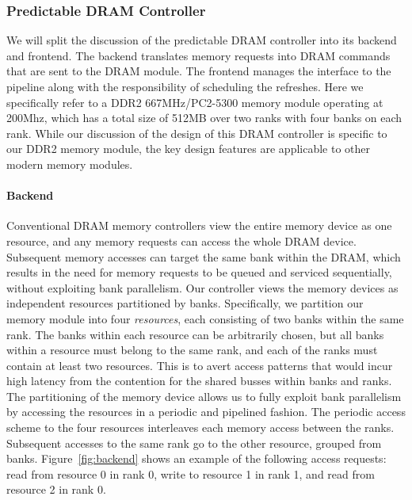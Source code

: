 \subsubsection{Predictable DRAM Controller}
\label{sec:pret_dram_controller}
We will split the discussion of the predictable DRAM controller into its backend and frontend. 
The backend translates memory requests into DRAM commands that are sent to the DRAM module.
The frontend manages the interface to the pipeline along with the responsibility of scheduling the refreshes.
Here we specifically refer to a DDR2 667MHz/PC2-5300 memory module operating at 200Mhz, which has a total size of 512MB over two ranks with four banks on each rank.
While our discussion of the design of this DRAM controller is specific to our DDR2 memory module, the key design features are applicable to other modern memory modules.

\paragraph{Backend}
Conventional DRAM memory controllers view the entire memory device as one resource, and any memory requests can access the whole DRAM device. 
Subsequent memory accesses can target the same bank within the DRAM, which results in the need for memory requests to be queued and serviced sequentially, without exploiting bank parallelism.
Our controller views the memory devices as independent resources partitioned by banks. 
Specifically, we partition our memory module into four \emph{resources}, each consisting of two banks within the same rank. 
The banks within each resource can be arbitrarily chosen, but all banks within a resource must belong to the same rank, and each of the ranks must contain at least two resources.
This is to avert access patterns that would incur high latency from the contention for the shared busses within banks and ranks.
The partitioning of the memory device allows us to fully exploit bank parallelism by accessing the resources in a periodic and pipelined fashion.
The periodic access scheme to the four resources interleaves each memory access between the ranks.
Subsequent accesses to the same rank go to the other resource, grouped from banks.  
Figure~\ref{fig:backend} shows an example of the following access requests: read from resource 0 in rank 0, write to resource 1 in rank 1, and read from resource 2 in rank 0. 

